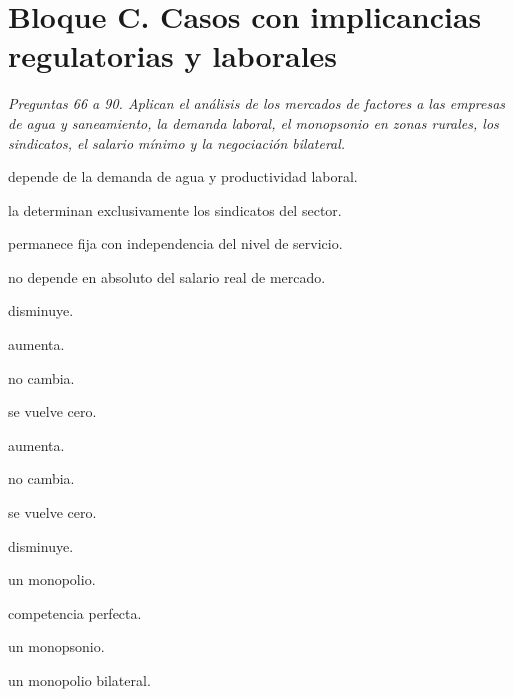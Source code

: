 \section*{Bloque C. Casos con implicancias regulatorias y laborales}

\noindent\textit{Preguntas 66 a 90. Aplican el análisis de los mercados de factores a las empresas de agua y saneamiento, la demanda laboral, el monopsonio en zonas rurales, los sindicatos, el salario mínimo y la negociación bilateral.}

\begin{opts}
    \item depende de la demanda de agua y productividad laboral.
    \item la determinan exclusivamente los sindicatos del sector.
    \item permanece fija con independencia del nivel de servicio.
    \item no depende en absoluto del salario real de mercado.
\end{opts}

\begin{opts}
    \item disminuye.
    \item aumenta.
    \item no cambia.
    \item se vuelve cero.
\end{opts}

\begin{opts}
    \item aumenta.
    \item no cambia.
    \item se vuelve cero.
    \item disminuye.
\end{opts}

\begin{opts}
    \item un monopolio.
    \item competencia perfecta.
    \item un monopsonio.
    \item un monopolio bilateral.
\end{opts}

